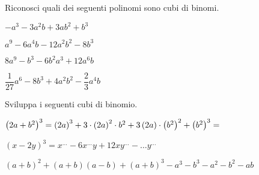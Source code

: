 \subsubsection*{}

\begin{esercizio}
 \label{ese:11.24}
Riconosci quali dei seguenti polinomi sono cubi di binomi.
\TabPositions{5cm}
\begin{enumeratea}
 \item $-a^{3}-3a^{2}b+3{ab}^{2}+b^{3}$ \tab\boxSi\quad\boxNo
 \item $a^{9}-6a^{4}b-12a^{2}b^{2}-8b^{3}$ \tab\boxSi\quad\boxNo
 \item $8a^{9}-b^{3}-6b^{2}a^{3}+12a^{6}b$ \tab\boxSi\quad\boxNo
 \item $\dfrac{1}{27}a^{6}-8b^{3}+4a^{2}b^{2}-\dfrac{2}{3}a^{4}b$ 
\tab\boxSi\quad\boxNo
\end{enumeratea}
\end{esercizio}

\begin{esercizio}
 \label{ese:11.25}
 Sviluppa i seguenti cubi di binomio.

 \begin{enumeratea}
\item $ 
\left(2a+b^{2}\right)^{3}=\left(2a\right)^{3}+3\cdot\left(2a\right)^{2}\cdot 
b^{2}+3\left(2a\right)\cdot\left(b^{2}\right)^{2}+\left(b^{2}\right)^{3}
=\dotfill~$
\item $\left(x-2y\right)^{3}=x^{\ldots }-6x^{\ldots }y+12{xy}^{\ldots}-\ldots 
y^{\ldots }$
\item $(a+b)^{2}+(a+b)(a-b)+(a+b)^{3}-a^{3}-b^{3}-a^{2}-b^{2}-{ab}$
\end{enumeratea}
\end{esercizio}

